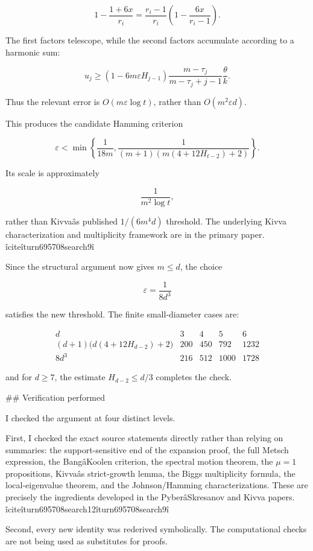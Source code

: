 \[
1-\frac{1+6x}{r_i}
=
\frac{r_i-1}{r_i}
\left(1-\frac{6x}{r_i-1}\right).
\]

The first factors telescope, while the second factors accumulate according to a harmonic sum:

\[
\boxed{
u_j\ge
\left(1-6m\varepsilon H_{j-1}\right)
\frac{m-\tau_j}{m-\tau_j+j-1}
\frac{\theta}{k}.
}
\]

Thus the relevant error is \(O(m\varepsilon\log t)\), rather than \(O(m^2\varepsilon d)\).

This produces the candidate Hamming criterion

\[
\varepsilon<
\min\left\{
\frac1{18m},
\frac1{(m+1)\left(m(4+12H_{t-2})+2\right)}
\right\}.
\]

Its scale is approximately

\[
\frac{1}{m^2\log t},
\]

rather than Kivvaâs published \(1/(6m^4d)\) threshold. The underlying Kivva characterization and multiplicity framework are in the primary paper. îciteîturn695708search9î

Since the structural argument now gives \(m\le d\), the choice

\[
\varepsilon=\frac1{8d^3}
\]

satisfies the new threshold. The finite small-diameter cases are:

\[
\begin{array}{c|cccc}
d&3&4&5&6\\
\hline
(d+1)\bigl(d(4+12H_{d-2})+2\bigr)
&200&450&792&1232\\
8d^3&216&512&1000&1728
\end{array}
\]

and for \(d\ge7\), the estimate \(H_{d-2}\le d/3\) completes the check.

## Verification performed

I checked the argument at four distinct levels.

First, I checked the exact source statements directly rather than relying on summaries: the support-sensitive end of the expansion proof, the full Metsch expression, the BangâKoolen criterion, the spectral motion theorem, the \(\mu=1\) propositions, Kivvaâs strict-growth lemma, the Biggs multiplicity formula, the local-eigenvalue theorem, and the Johnson/Hamming characterizations. These are precisely the ingredients developed in the PyberâSkresanov and Kivva papers. îciteîturn695708search12îturn695708search9î

Second, every new identity was rederived symbolically. The computational checks are not being used as substitutes for proofs.

